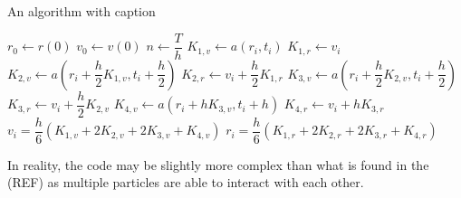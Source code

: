 \begin{algorithm}
\caption{An algorithm with caption}\label{alg:cap} %
\begin{algorithmic}[1]
\State $r_0 \gets r(0)$
    \State $v_0 \gets v(0)$
    \State $n \gets \dfrac{T}{h}$
        \State $K_{1,v} \gets a(r_i, t_i)$
        \State $K_{1,r} \gets v_i$
        \State $K_{2,v} \gets a(r_i + \dfrac{h}{2}K_{1,v}, t_i + \dfrac{h}{2})$
        \State $K_{2,r} \gets v_i + \dfrac{h}{2} K_{1,r}$
        \State $K_{3,v} \gets a(r_i + \dfrac{h}{2}K_{2,v}, t_i + \dfrac{h}{2})$
        \State $K_{3,r} \gets v_i + \dfrac{h}{2} K_{2,v}$
        \State $K_{4, v} \gets a(r_i + hK_{3,v}, t_i+h)$
        \State $K_{4, r} \gets v_i + hK_{3,r}$
        \State $v_i = \dfrac{h}{6}(K_{1,v} + 2K_{2,v} + 2K_{3,v} + K_{4,v})$
        \State $r_i = \dfrac{h}{6}(K_{1,r} + 2K_{2,r} + 2K_{3,r} + K_{4,r})$
    \EndFor
\end{algorithmic}
\end{algorithm}

In reality, the code may be slightly more complex than what is found in the (REF) as multiple particles are able to interact with each other.

